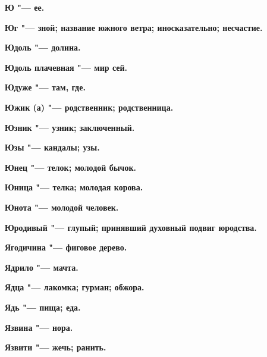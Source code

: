  





\bfseries Ю \normalfont{} "--- ее. 




\bfseries Юг \normalfont{} "--- зной; название южного ветра; иносказательно; несчастие. 




\bfseries Юдоль \normalfont{} "--- долина. 




\bfseries Юдоль плачевная \normalfont{} "--- мир сей. 




\bfseries Юдуже \normalfont{} "--- там, где. 




\bfseries Южик (а) \normalfont{} "--- родственник; родственница. 




\bfseries Юзник \normalfont{} "--- узник; заключенный. 




\bfseries Юзы \normalfont{} "--- кандалы; узы. 




\bfseries Юнец \normalfont{} "--- телок; молодой бычок. 




\bfseries Юница \normalfont{} "--- телка; молодая корова. 




\bfseries Юнота \normalfont{} "--- молодой человек. 




\bfseries Юродивый \normalfont{} "--- глупый; принявший духовный подвиг юродства. 




 





\bfseries Ягодичина \normalfont{} "--- фиговое дерево. 




\bfseries Ядрило \normalfont{} "--- мачта. 




\bfseries Ядца \normalfont{} "--- лакомка; гурман; обжора. 




\bfseries Ядь \normalfont{} "--- пища; еда. 




\bfseries Язвина \normalfont{} "--- нора. 




\bfseries Язвити \normalfont{} "--- жечь; ранить. 




